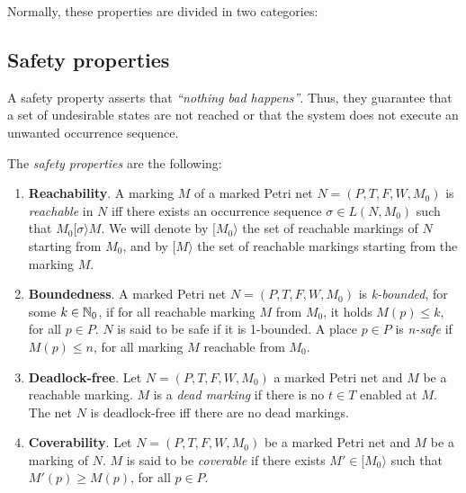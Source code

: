 \medskip
Normally, these properties are divided in two categories: %

\subsection{Safety properties}
A safety property asserts that \emph{``nothing bad happens''}.
Thus, they guarantee that a set of undesirable states are not reached or that
the system does not execute an unwanted occurrence sequence.

The \emph{safety properties} are the following:

\begin{enumerate}
\item {\bf Reachability}. A marking $M$ of a marked Petri net
$N= (P,T,F,W,M_0)$ is {\it reachable} in $N$
iff there exists an occurrence sequence $\sigma \in L(N,M_0)$
such that $M_0 [ \sigma \rangle M$. We will denote by $[M_0\rangle$ the
set of reachable markings of $N$ starting from $M_0$, and
by $[ M \rangle$ the set of reachable markings starting from the marking $M$.

\item {\bf Boundedness}. A marked Petri net $N=(P,T,F,W,M_0)$ 
is {\it k-bounded}, for some $k \in \mathbb{N}_{0}$, if for all reachable marking
$M$ from $M_0$, it holds $M(p) \leq k$, for all $p \in P$. $N$ is said to be safe if
it is 1-bounded. A place $p \in P$ is
{\it n-safe} if $M(p) \leq n$, for all marking $M$ reachable from $M_0$.

\item {\bf Deadlock-free}. Let $N=(P,T,F,W,M_0)$ a marked Petri net and $M$ be a reachable marking.
$M$ is a {\it dead marking} if there is no $t \in T$ enabled at $M$. 
The net $N$ is deadlock-free iff there are no dead markings.

\item {\bf Coverability}.
Let $N=(P,T,F,W,M_0)$ be a marked Petri net and $M$ be a marking of $N$.
$M$ is said to be {\it coverable} if there exists $M' \in
[M_0 \rangle$ such that $M'(p) \geq M(p)$, for all $p \in P$.
\end{enumerate}

